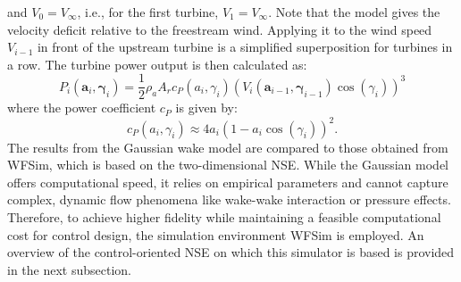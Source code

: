 and $V_0 = V_{\infty}$, i.e., for the first turbine, $V_1 = V_{\infty}$. Note that the model gives the velocity deficit relative to the freestream wind. Applying it to the wind speed $V_{i-1}$ in front of the upstream turbine is a simplified superposition for turbines in a row.
The turbine power output is then calculated as:
\[
P_i(\bm{a}_i,\bm{\gamma}_i) = \frac{1}{2} \rho_a A_r c_{P}(a_i,\gamma_i)(V_{i}(\bm{a}_{i-1},\bm{\gamma}_{i-1}) \cos(\gamma_i))^3
\]
where the power coefficient $c_P$ is given by:
\[
c_P(a_i,\gamma_i)  \approx 4a_i(1-a_i\cos(\gamma_i))^2.
\]
%
The results from the Gaussian wake model are compared to those obtained from WFSim, which is based on the two-dimensional NSE. While the Gaussian model offers computational speed, it relies on empirical parameters and cannot capture complex, dynamic flow phenomena like wake-wake interaction or pressure effects. Therefore, to achieve higher fidelity while maintaining a feasible computational cost for control design, the simulation environment WFSim is employed. An overview of the control-oriented NSE on which this simulator is based is provided in the next subsection.

